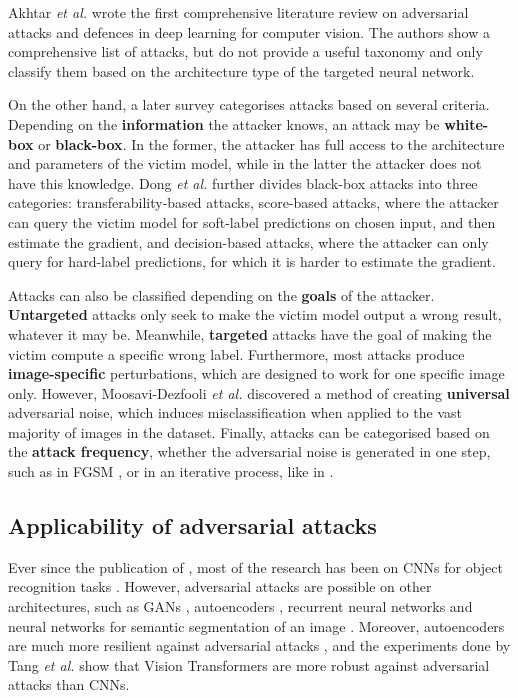 Akhtar \textit{et al.} \cite{akhtar} wrote the first comprehensive literature review on adversarial attacks and defences in deep learning for computer vision. The authors show a comprehensive list of attacks, but do not provide a useful taxonomy and only classify them based on the architecture type of the targeted neural network. 

On the other hand, a later survey \cite{silva_survey} categorises attacks based on several criteria. Depending on the \textbf{information} the attacker knows, an attack may be \textbf{white-box} or \textbf{black-box}. In the former, the attacker has full access to the architecture and parameters of the victim model, while in the latter the attacker does not have this knowledge. Dong \textit{et al.} \cite{dong2020benchmarking} further divides black-box attacks into three categories: transferability-based attacks, score-based attacks, where the attacker can query the victim model for soft-label predictions on chosen input, and then estimate the gradient, and decision-based attacks, where the attacker can only query for hard-label predictions, for which it is harder to estimate the gradient.

Attacks can also be classified depending on the \textbf{goals} of the attacker. \textbf{Untargeted} attacks only seek to make the victim model output a wrong result, whatever it may be. Meanwhile, \textbf{targeted} attacks have the goal of making the victim compute a specific wrong label. Furthermore, most attacks produce \textbf{image-specific} perturbations, which are designed to work for one specific image only. However, Moosavi-Dezfooli \textit{et al.} \cite{Moosavi-Dezfooli_2017_CVPR} discovered a method of creating \textbf{universal} adversarial noise, which induces misclassification when applied to the vast majority of images in the dataset. Finally, attacks can be categorised based on the \textbf{attack frequency}, whether the adversarial noise is generated in one step, such as in FGSM \cite{fgsm}, or in an iterative process, like in \cite{carlini2017towards}.

\subsection{Applicability of adversarial attacks}
  
Ever since the publication of \cite{szegedy2014intriguing}, most of the research has been on CNNs for object recognition tasks \cite{akhtar}. However, adversarial attacks are possible on other architectures, such as GANs \cite{kos_attacks_on_gans}, autoencoders \cite{tabacof_attacks_autoencoders}, recurrent neural networks \cite{papernot_attacks_rnns} and neural networks for semantic segmentation of an image \cite{Metzen_2017_ICCV}. Moreover, autoencoders are much more resilient against adversarial attacks \cite{tabacof_attacks_autoencoders}, and the experiments done by Tang \textit{et al.} \cite{robustart} show that Vision Transformers are more robust against adversarial attacks than CNNs.

